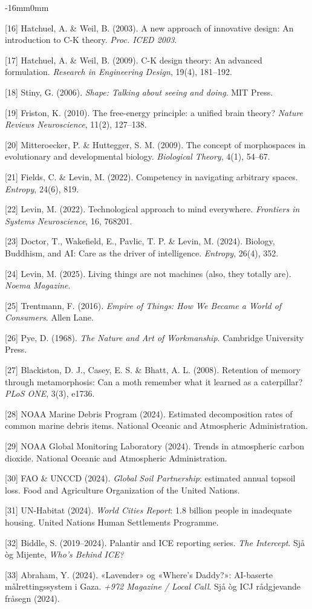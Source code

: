 \documentclass[10pt,oneside]{book}
\newcommand{\refentry}[1]{%
  \par\addvspace{0pt}%
  \begingroup\footnotesize\linespread{0.92}\selectfont
  \noindent\hangindent=4mm\hangafter=1 #1\par%
  \endgroup
}
\newenvironment{widebody}{%
  \begin{adjustwidth}{-16mm}{0mm}%
}{%
  \end{adjustwidth}%
}
\begin{document}
\begin{widebody}
\refentry{[16] Hatchuel, A. \& Weil, B. (2003). A new approach of innovative design: An introduction to C-K theory. \textit{Proc. ICED 2003}.}
\refentry{[17] Hatchuel, A. \& Weil, B. (2009). C-K design theory: An advanced formulation. \textit{Research in Engineering Design}, 19(4), 181--192.}
\refentry{[18] Stiny, G. (2006). \textit{Shape: Talking about seeing and doing}. MIT Press.}
\refentry{[19] Friston, K. (2010). The free-energy principle: a unified brain theory? \textit{Nature Reviews Neuroscience}, 11(2), 127--138.}
\refentry{[20] Mitteroecker, P. \& Huttegger, S. M. (2009). The concept of morphospaces in evolutionary and developmental biology. \textit{Biological Theory}, 4(1), 54--67.}
\refentry{[21] Fields, C. \& Levin, M. (2022). Competency in navigating arbitrary spaces. \textit{Entropy}, 24(6), 819.}
\refentry{[22] Levin, M. (2022). Technological approach to mind everywhere. \textit{Frontiers in Systems Neuroscience}, 16, 768201.}
\refentry{[23] Doctor, T., Wakefield, E., Pavlic, T. P. \& Levin, M. (2024). Biology, Buddhism, and AI: Care as the driver of intelligence. \textit{Entropy}, 26(4), 352.}
\refentry{[24] Levin, M. (2025). Living things are not machines (also, they totally are). \textit{Noema Magazine}.}
\refentry{[25] Trentmann, F. (2016). \textit{Empire of Things: How We Became a World of Consumers}. Allen Lane.}
\refentry{[26] Pye, D. (1968). \textit{The Nature and Art of Workmanship}. Cambridge University Press.}
\refentry{[27] Blackiston, D. J., Casey, E. S. \& Bhatt, A. L. (2008). Retention of memory through metamorphosis: Can a moth remember what it learned as a caterpillar? \textit{PLoS ONE}, 3(3), e1736.}
\refentry{[28] NOAA Marine Debris Program (2024). Estimated decomposition rates of common marine debris items. National Oceanic and Atmospheric Administration.}
\refentry{[29] NOAA Global Monitoring Laboratory (2024). Trends in atmospheric carbon dioxide. National Oceanic and Atmospheric Administration.}
\refentry{[30] FAO \& UNCCD (2024). \textit{Global Soil Partnership}: estimated annual topsoil loss. Food and Agriculture Organization of the United Nations.}
\refentry{[31] UN-Habitat (2024). \textit{World Cities Report}: 1.8 billion people in inadequate housing. United Nations Human Settlements Programme.}
\refentry{[32] Biddle, S. (2019--2024). Palantir and ICE reporting series. \textit{The Intercept}. Sjå òg Mijente, \textit{Who's Behind ICE?}}
\refentry{[33] Abraham, Y. (2024). «Lavender» og «Where's Daddy?»: AI-baserte målrettingssystem i Gaza. \textit{+972 Magazine / Local Call}. Sjå òg ICJ rådgjevande fråsegn (2024).}

\end{widebody}
\end{document}
